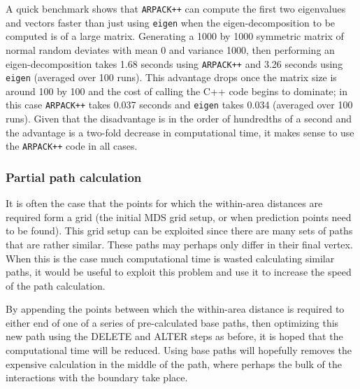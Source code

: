 A quick benchmark shows that \texttt{ARPACK++} can compute the first two eigenvalues and vectors faster than just using \texttt{eigen} when the eigen-decomposition to be computed is of a large matrix. Generating a 1000 by 1000 symmetric matrix of normal random deviates with mean 0 and variance 1000, then performing an eigen-decomposition takes 1.68 seconds using \texttt{ARPACK++} and 3.26 seconds using \texttt{eigen} (averaged over 100 runs). This advantage drops once the matrix size is around 100 by 100 and the cost of calling the C++ code begins to dominate; in this case \texttt{ARPACK++} takes 0.037 seconds and \texttt{eigen} takes 0.034 (averaged over 100 runs). Given that the disadvantage is in the order of hundredths of a second and the advantage is a two-fold decrease in computational time, it makes sense to use the \texttt{ARPACK++} code in all cases.


\subsubsection{Partial path calculation}

It is often the case that the points for which the within-area distances are required form a grid (the initial MDS grid setup, or when prediction points need to be found). This grid setup can be exploited since there are many sets of paths that are rather similar. These paths may perhaps only differ in their final vertex. When this is the case much computational time is wasted calculating similar paths, it would be useful to exploit this problem and use it to increase the speed of the path calculation.

By appending the points between which the within-area distance is required to either end of one of a series of pre-calculated base paths, then optimizing this new path using the DELETE and ALTER steps as before, it is hoped that the computational time will be reduced. Using base paths will hopefully removes the expensive calculation in the middle of the path, where perhaps the bulk of the interactions with the boundary take place.

